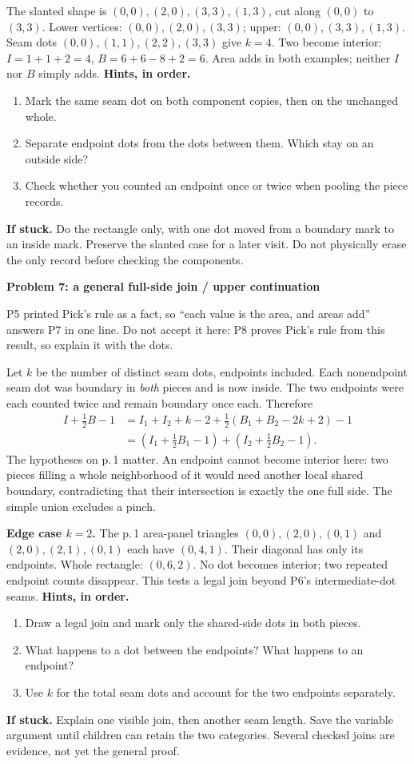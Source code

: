 \documentclass[letterpaper,11pt]{article}
\newcommand{\subhead}[1]{\vspace{2pt}\textbf{#1}\par}
\newcommand{\hints}[3]{\textbf{Hints, in order.}\begin{enumerate}\item #1\item #2\item #3\end{enumerate}}
\begin{document}
The slanted shape is $(0,0),\allowbreak(2,0),\allowbreak(3,3),\allowbreak(1,3)$, cut along $(0,0)$ to $(3,3)$. Lower vertices: $(0,0),\allowbreak(2,0),\allowbreak(3,3)$; upper: $(0,0),\allowbreak(3,3),\allowbreak(1,3)$. Seam dots $(0,0),\allowbreak(1,1),\allowbreak(2,2),\allowbreak(3,3)$ give $k=4$. Two become interior: $I=1+1+2=4$, $B=6+6-8+2=6$. Area adds in both examples; neither $I$ nor $B$ simply adds.
\hints{Mark the same seam dot on both component copies, then on the unchanged whole.}{Separate endpoint dots from the dots between them. Which stay on an outside side?}{Check whether you counted an endpoint once or twice when pooling the piece records.}
\textbf{If stuck.} Do the rectangle only, with one dot moved from a boundary mark to an inside mark. Preserve the slanted case for a later visit. Do not physically erase the only record before checking the components.

\subhead{Problem 7: a general full-side join / upper continuation}
P5 printed Pick's rule as a fact, so ``each value is the area, and areas add'' answers P7 in one line. Do not accept it here: P8 proves Pick's rule from this result, so explain it with the dots.

Let $k$ be the number of distinct seam dots, endpoints included. Each nonendpoint seam dot was boundary in \emph{both} pieces and is now inside. The two endpoints were each counted twice and remain boundary once each. Therefore
\begin{align*}
I+\tfrac12 B-1
&=I_1+I_2+k-2+\tfrac12(B_1+B_2-2k+2)-1\\
&=(I_1+\tfrac12 B_1-1)+(I_2+\tfrac12 B_2-1).
\end{align*}
The hypotheses on p.\,1 matter. An endpoint cannot become interior here: two pieces filling a whole neighborhood of it would need another local shared boundary, contradicting that their intersection is exactly the one full side. The simple union excludes a pinch.

\textbf{Edge case $k=2$.} The p.\,1 area-panel triangles $(0,0),\allowbreak(2,0),\allowbreak(0,1)$ and $(2,0),\allowbreak(2,1),\allowbreak(0,1)$ each have $(0,4,1)$. Their diagonal has only its endpoints. Whole rectangle: $(0,6,2)$. No dot becomes interior; two repeated endpoint counts disappear. This tests a legal join beyond P6's intermediate-dot seams.
\hints{Draw a legal join and mark only the shared-side dots in both pieces.}{What happens to a dot between the endpoints? What happens to an endpoint?}{Use $k$ for the total seam dots and account for the two endpoints separately.}
\textbf{If stuck.} Explain one visible join, then another seam length. Save the variable argument until children can retain the two categories. Several checked joins are evidence, not yet the general proof.
\newpage
\end{document}
